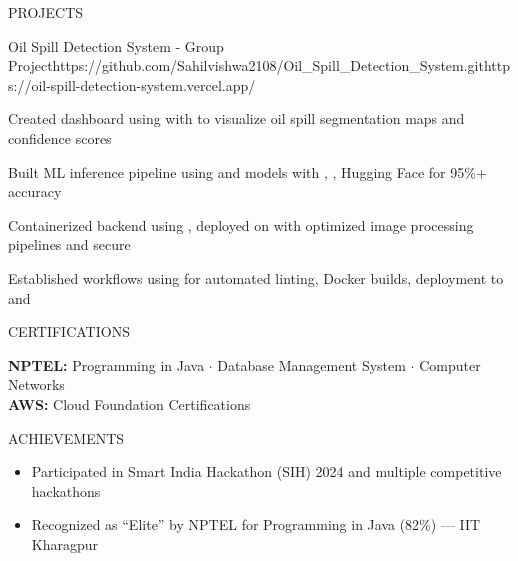 \documentclass{resume}
\begin{document}
\begin{rSection}{PROJECTS}
\begin{rProject}{Oil Spill Detection System - Group Project}{https://github.com/Sahilvishwa2108/Oil_Spill_Detection_System.git}{https://oil-spill-detection-system.vercel.app/}
\item Created dashboard using  with  to visualize oil spill segmentation maps and confidence scores
\item Built ML inference pipeline using  and  models with , , Hugging Face for 95\%+ accuracy
\item Containerized backend using , deployed on  with optimized image processing pipelines and secure 
\item Established  workflows using  for automated linting, Docker builds, deployment to  and 
\end{rProject}

\end{rSection}

\begin{rSection}{CERTIFICATIONS}

\textbf{NPTEL:} Programming in Java $\cdot$ Database Management System $\cdot$ Computer Networks \\[1pt]
\textbf{AWS:} Cloud Foundation Certifications

\end{rSection}

\begin{rSection}{ACHIEVEMENTS}

\begin{itemize}[leftmargin=12pt, itemsep=0pt, label={\small$\bullet$}]
\item Participated in Smart India Hackathon (SIH) 2024 and multiple competitive hackathons
\item Recognized as ``Elite'' by NPTEL for Programming in Java (82\%) — IIT Kharagpur
\end{itemize}

\end{rSection}
\end{document}
